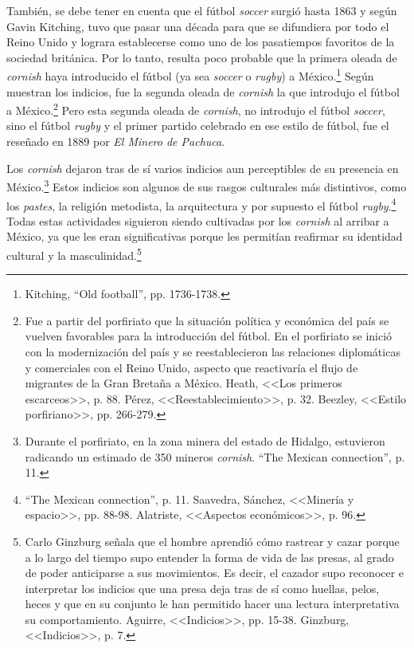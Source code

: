 \documentclass[11pt,a5paper,twoside]{book} %
\begin{document}
También, se debe tener en cuenta que el fútbol \emph{soccer} surgió hasta 1863 y según Gavin Kitching, tuvo que pasar una década para que se difundiera por todo el Reino Unido y lograra establecerse como uno de los pasatiempos favoritos de la sociedad británica. Por lo tanto, resulta poco probable que la primera oleada de \emph{cornish} haya introducido el fútbol (ya sea \emph{soccer} o \emph{rugby}) a México.\footnote{Kitching, ``Old football'', pp. 1736-1738.} Según muestran los indicios, fue la segunda oleada de \emph{cornish} la que introdujo el fútbol a México.\footnote{Fue a partir del porfiriato que la situación política y económica del país se vuelven favorables para la introducción del fútbol. En el porfiriato se inició con la modernización del país y se reestablecieron las relaciones diplomáticas y comerciales con el Reino Unido, aspecto que reactivaría el flujo de migrantes de la Gran Bretaña a México. Heath, <<Los primeros escarceos>>, p. 88. Pérez, <<Reestablecimiento>>, p. 32. Beezley, <<Estilo porfiriano>>, pp. 266-279.} Pero esta segunda oleada de \emph{cornish}, no introdujo el fútbol \emph{soccer}, sino el fútbol \emph{rugby} y el primer partido celebrado en ese estilo de fútbol, fue el reseñado en 1889 por \emph{El Minero de Pachuca}.

Los \emph{cornish} dejaron tras de sí varios indicios aun perceptibles de su presencia en México.\footnote{Durante el porfiriato, en la zona minera del estado de Hidalgo, estuvieron radicando un estimado de 350 mineros \emph{cornish}. ``The Mexican connection'', p. 11.} Estos indicios son algunos de sus rasgos culturales más distintivos, como los \emph{pastes}, la religión metodista, la arquitectura y por supuesto el fútbol \emph{rugby}.\footnote{``The Mexican connection'', p. 11. Saavedra, Sánchez, <<Minería y espacio>>, pp. 88-98. Alatriste, <<Aspectos económicos>>, p. 96.} Todas estas actividades siguieron siendo cultivadas por los \emph{cornish} al arribar a México, ya que les eran significativas porque les permitían reafirmar su identidad cultural y la masculinidad.\footnote{Carlo Ginzburg señala que el hombre aprendió cómo rastrear y cazar porque a lo largo del tiempo supo entender la forma de vida de las presas, al grado de poder anticiparse a sus movimientos. Es decir, el cazador supo reconocer e interpretar los indicios que una presa deja tras de sí como huellas, pelos, heces y que en su conjunto le han permitido hacer una lectura interpretativa su comportamiento. Aguirre, <<Indicios>>, pp. 15-38. Ginzburg, <<Indicios>>, p. 7.}
\end{document}
